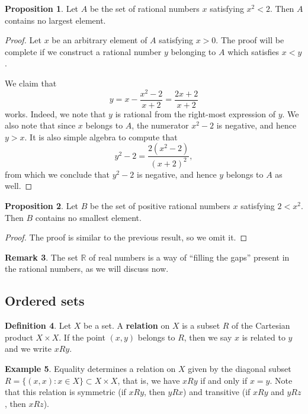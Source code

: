 \documentclass[12pt]{article}
\theoremstyle{definition}
\newtheorem{definition}{Definition}
\newtheorem{example}[definition]{Example}
\newtheorem{remark}[definition]{Remark}
\theoremstyle{theorem}
\newtheorem{proposition}[definition]{Proposition}
\begin{document}
\begin{proposition}
Let $A$ be the set of rational numbers $x$ satisfying $x^2 < 2$. Then $A$ contains no largest element. 
\end{proposition} 

\begin{proof}
Let $x$ be an arbitrary element of $A$ satisfying $x > 0$. The proof will be complete if we construct a rational number $y$ belonging to $A$ which satisfies $x < y$. 

We claim that 
\[
y = x - \frac{x^2 - 2}{x+2} = \frac{2x +2}{x+2}
\]
works. Indeed, we note that $y$ is rational from the right-most expression of $y$. We also note that since $x$ belongs to $A$, the numerator $x^2 - 2$ is negative, and hence $y > x$. It is also simple algebra to compute that 
\[
y^2 - 2 = \frac{2(x^2 - 2)}{(x+2)^2},
\]
from which we conclude that $y^2 - 2$ is negative, and hence $y$ belongs to $A$ as well. 
\end{proof}

\begin{proposition}
Let $B$ be the set of positive rational numbers $x$ satisfying $2 < x^2$. Then $B$ contains no smallest element. 
\end{proposition}

\begin{proof}
The proof is similar to the previous result, so we omit it. 
\end{proof}

\begin{remark}
The set $\mathbb{R}$ of real numbers is a way of ``filling the gaps'' present in the rational numbers, as we will discuss now. 
\end{remark}

\subsection{Ordered sets}

\begin{definition}
Let $X$ be a set. A \textbf{relation} on $X$ is a subset $R$ of the Cartesian product $X \times X$. If the point $(x,y)$ belongs to $R$, then we say $x$ is related to $y$ and we write $xRy$.  
\end{definition}

\begin{example}
Equality determines a relation on $X$ given by the diagonal subset $R = \{(x,x) : x \in X\} \subset X \times X$, that is, we have $xRy$ if and only if $x = y$.  Note that this relation is symmetric (if $xRy$, then $yRx$) and transitive (if $xRy$ and $yRz$, then $xRz$). 
\end{example}
\end{document}
